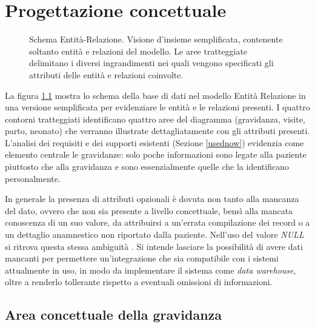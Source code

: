 \chapter{Progettazione concettuale}
\label{conceptual}

\newcommand{\ent}[1]{{\Large #1}}
\newcommand{\card}[1]{{\footnotesize #1}}
\newcommand{\CZU}{\card{(0,1)}}
\newcommand{\CZN}{\card{(0,n)}}
\newcommand{\CUU}{\card{(1,1)}}
\newcommand{\CUN}{\card{(1,n)}}

\begin{figure}
    \centering
    
    \caption{Schema Entità-Relazione. Visione d'insieme semplificata, contenente soltanto entità e relazioni del modello. Le aree tratteggiate delimitano i diversi ingrandimenti nei quali vengono specificati gli attributi delle entità e relazioni coinvolte.}
    \label{completeerdiagram}
\end{figure}

La figura \ref{completeerdiagram} mostra lo schema della base di dati nel modello Entità Relazione in una versione semplificata per evidenziare le entità e le relazioni presenti.
I quattro contorni tratteggiati identificano quattro aree del diagramma (gravidanza, visite, parto, neonato) che verranno illustrate dettagliatamente con gli attributi presenti.
L'analisi dei requisiti e dei supporti esistenti (Sezione \ref{usednow}) evidenzia come elemento centrale le gravidanze: solo poche informazioni sono legate alla paziente piuttosto che alla gravidanza e sono essenzialmente quelle che la identificano personalmente.

In generale la presenza di attributi opzionali è dovuta non tanto alla mancanza del dato, ovvero che non sia presente a livello concettuale, bensì alla mancata conoscenza di un suo valore, da attribuirsi a un'errata compilazione dei record o a un dettaglio anamnestico non riportato dalla paziente.
Nell'uso del valore \emph{NULL} si ritrova questa stessa ambiguità \cite{Sil11}.
Si intende lasciare la possibilità di avere dati mancanti per permettere un'integrazione che sia compatibile con i sistemi attualmente in uso, in modo da implementare il sistema come \emph{data warehouse}, oltre a renderlo tollerante rispetto a eventuali omissioni di informazioni.

\section{Area concettuale della gravidanza}

